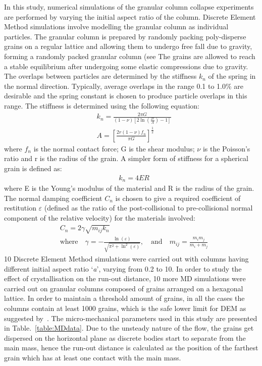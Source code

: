 In this study, numerical simulations of the granular column collapse 
experiments are performed by varying the initial aspect ratio of the column. 
Discrete Element Method simulations involve modelling the granular column as 
individual particles. The granular column is prepared by randomly packing 
poly-disperse grains on a regular lattice and allowing them to undergo free 
fall due to gravity, forming a randomly packed granular column (see  %
The grains are allowed to reach a stable equilibrium after undergoing some 
elastic compressions due to gravity. 
The overlaps between particles are determined by the stiffness 
$\textit{k}_{\textit{n}}$ of the spring in the normal direction. Typically, 
average overlaps in the range 0.1 to 1.0\% are desirable and the spring 
constant is chosen to produce particle overlaps in this range. The stiffness is 
determined using the following equation:
\begin{align}
& \textit{k}_{\textit{n}}=\frac{2 \pi G}{(1-\nu)[2\ln(\frac{2r}{A})-1]} \\ 
& A = [\frac{2r(1-\nu)f_{n}}{\pi G}]^{\frac{1	}{2}}
\end{align}
where $f_{n}$ is the normal contact force; G is the shear modulus; $\nu$ is the 
Poisson's ratio and r is the radius of the grain. A simpler form of stiffness 
for a spherical grain is defined as:
\begin{align}
& \textit{k}_{\textit{n}}=4ER
\end{align}
where E is the Young's modulus of the material and R is the radius of the 
grain. The normal damping coefficient $C_{\textit{n}}$ is chosen to give a 
required coefficient of restitution $\varepsilon$ (defined as the ratio of the 
post-collisional to pre-collisional normal component of the relative velocity) 
for the materials involved:
\begin{align}
& C_{\textit{n}}=2\gamma \sqrt{m_{\textit{ij}}k_{\textit{n}}} \\ 
& \mbox{where} \quad \gamma = -\frac{\ln(\varepsilon)}{\sqrt{\pi^{2}+\ln^2 
(\varepsilon)}},\quad \mbox{and} \quad 
\textit{m}_{\textit{ij}}=\frac{\textit{m}_{\textit{i}}\textit{m}_{\textit{j}}}{\textit{m}_{\textit{i}}
 + \textit{m}_{\textit{j}}} 
\end{align}
10 Discrete Element Method simulations were carried out with columns having 
different initial aspect ratio `\textit{a}', varying from 0.2 to 10. In order 
to study the effect of crystallisation on the run-out distance, 10 more MD 
simulations were carried out on granular columns composed of grains arranged on 
a hexagonal lattice. In order to maintain a threshold amount of grains, in all 
the cases the columns contain at least 1000 grains, which is the safe lower 
limit for DEM as suggested by~\citet{Oda1999}. The micro-mechanical parameters 
used in this study are presented in Table.~\ref{table:MDdata}. Due to the 
unsteady nature of the flow, the grains get dispersed on the horizontal plane 
as discrete bodies start to separate from the main mass, hence the run-out 
distance is calculated as the position of the farthest grain which has at least 
one contact with the main mass.

